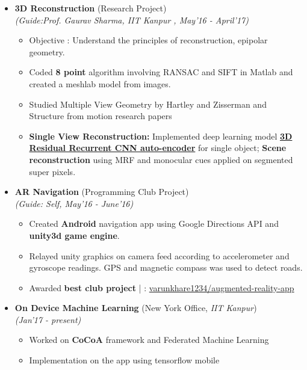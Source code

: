 \documentclass[a4paper,10pt]{article}
\newcommand{\isep}{-2 pt}
\begin{document}
\begin{itemize}
\item \textbf{3D Reconstruction} (Research Project) \\
\emph{(Guide:Prof. Gaurav Sharma, IIT Kanpur
, May'16 - April'17)} \\[-0.6cm]
	\begin{itemize}\itemsep \isep
	\item Objective : Understand the principles of reconstruction, epipolar geometry.
	\item Coded \textbf{8 point} algorithm involving RANSAC and SIFT in Matlab and created a meshlab model from images. \item Studied Multiple View Geometry by Hartley and Zisserman and Structure from motion research papers
	\item \textbf{Single View Reconstruction:} Implemented deep learning model \textbf{\href{https://arxiv.org/pdf/1604.00449.pdf}{3D Residual Recurrent CNN auto-encoder}} for single object; \textbf{{Scene reconstruction}} using MRF and monocular cues applied on segmented super pixels. 
	\end{itemize}
\item \textbf{AR Navigation} (Programming Club Project) \\
\emph{(Guide: Self, May'16 - June'16)} \\[-0.6cm]
	\begin{itemize}\itemsep \isep
	\item Created \textbf{Android} navigation app using Google Directions API and \textbf{unity3d game engine}.
	\item Relayed unity graphics on camera feed according to accelerometer and gyroscope readings. GPS and magnetic compass was used to detect roads.
	\item Awarded \textbf{best club project} | \faGithub : \href{https://github.com/varunkhare1234/augmented-reality-app}{varunkhare1234/augmented-reality-app}
	\end{itemize}
\item \textbf{On Device Machine Learning} (New York Office, \textit{IIT Kanpur}) \\
\emph{(Jan'17 - present)} \\[-0.6cm]
	\begin{itemize}\itemsep \isep
	\item Worked on \textbf{CoCoA} framework and Federated Machine Learning 
	\item Implementation on the app using tensorflow mobile
	\end{itemize}

\end{itemize}
\end{document}
